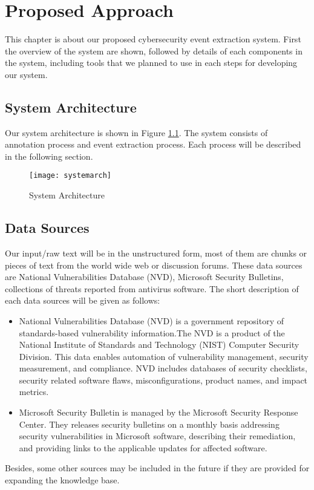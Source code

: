 
\chapter{Proposed Approach}
\thispagestyle{plain}



\label{Chapter3}

This chapter is about our proposed cybersecurity event extraction system. First the overview of the system are shown, followed by details of each components in the system, including tools that we planned to use in each steps for developing our system.

\section{System Architecture}
\label{architecture}
Our system architecture is shown in Figure \ref{fig:systemarch}. The system consists of annotation process and event extraction process. Each process will be described in the following section.

\begin{figure}
    \centering
    \texttt{[image: systemarch]}
    \caption{System Architecture}
    \label{fig:systemarch}
\end{figure}

\section{Data Sources}
\label{datasources}
Our input/raw text will be in the unstructured form, most of them are chunks or pieces of text from the world wide web or discussion forums. These data sources are National Vulnerabilities Database (NVD), Microsoft Security Bulletins, collections of threats reported from antivirus software. The short description of each data sources will be given as follows:
\begin{itemize}
    \item National Vulnerabilities Database (NVD) is a government repository of standards-based vulnerability information.The NVD is a product of the National Institute of Standards and Technology (NIST) Computer Security Division. This data enables automation of vulnerability management, security measurement, and compliance. NVD includes databases of security checklists, security related software flaws, misconfigurations, product names, and impact metrics.
    \item Microsoft Security Bulletin is managed by the Microsoft Security Response Center. They releases security bulletins on a monthly basis addressing security vulnerabilities in Microsoft software, describing their remediation, and providing links to the applicable updates for affected software. 
\end{itemize}
Besides, some other sources may be included in the future if they are provided for expanding the knowledge base.

